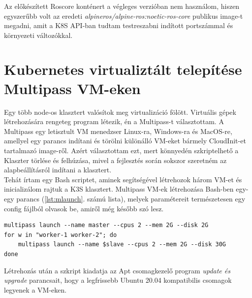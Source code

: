 \noindent
Az előkészített Roscore konténert a végleges verzióban nem használom, hiszen egyszerűbb volt az eredeti \emph{alpineros/alpine-ros:noetic-ros-core} publikus image-t megadni, amit a K8S API-ban tudtam testreszabni indított portszámmal és környezeti változókkal.

\section{Kubernetes virtualiztált telepítése Multipass VM-eken}

Egy több node-os klasztert valósítok meg virtualizáció fölött. Virtuális gépek létrehozására rengeteg program létezik, én a Multipass-t választottam. A Multipass egy letisztult VM menedzser Linux-ra, Windows-ra és MacOS-re, amellyel egy parancs indítani és törölni különálló VM-eket bármely CloudInit-et tartalmazó image-ről. Azért választottam ezt, mert könnyedén szkriptelhető a Klaszter törlése és felhúzása, mivel a fejlesztés során sokszor szeretném az alapbeállításról indítani a klasztert. \\

\noindent
Tehát írtam egy Bash scriptet, aminek segítségével létrehozok három VM-et és inicializálom rajtuk a K3S klasztert. Multipass VM-ek létrehozása Bash-ben egy-egy parancs (\ref{lst:mlaunch}. számú lista), melyek paramétereit természetesen egy config fájlból olvasok be, amiről még később szó lesz.
\begin{minipage}{\linewidth}
\begin{lstlisting}[caption={Multipass VM-ek létrehozása},label={lst:mlaunch}]
multipass launch --name master --cpus 2 --mem 2G --disk 2G
for w in "worker-1 worker-2"; do
	multipass launch --name $slave --cpus 2 --mem 2G --disk 30G
done
\end{lstlisting} 
\end{minipage}
\noindent
Létrehozás után a szkript kiadatja az Apt csomagkezelő program \emph{update és upgrade} parancsait, hogy a legfrissebb Ubuntu 20.04 kompatibilis csomagok legyenek a VM-eken. \\

